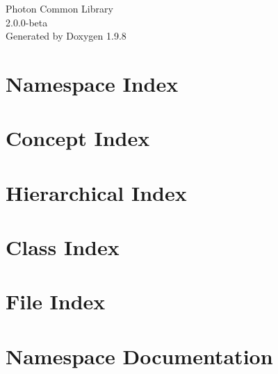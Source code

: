 \documentclass[twoside]{book}
\newcommand{\+}{\discretionary{\mbox{\scriptsize$\hookleftarrow$}}{}{}}
\newcommand{\clearemptydoublepage}{%
    \newpage{\pagestyle{empty}\cleardoublepage}%
  }
\begin{document}
  \raggedbottom
    \hypersetup{pageanchor=false,
                bookmarksnumbered=true,
                pdfencoding=unicode
               }
  \begin{titlepage}
  \vspace*{7cm}
  \begin{center}%
  {\Large Photon Common Library}\\
  [1ex]\large 2.\+0.\+0-\/beta \\
  \vspace*{1cm}
  {\large Generated by Doxygen 1.9.8}\\
  \end{center}
  \end{titlepage}
  \clearemptydoublepage
  \tableofcontents
  \clearemptydoublepage
  \hypersetup{pageanchor=true}

\chapter{Namespace Index}

\chapter{Concept Index}

\chapter{Hierarchical Index}

\chapter{Class Index}

\chapter{File Index}

\chapter{Namespace Documentation}









\end{document}
